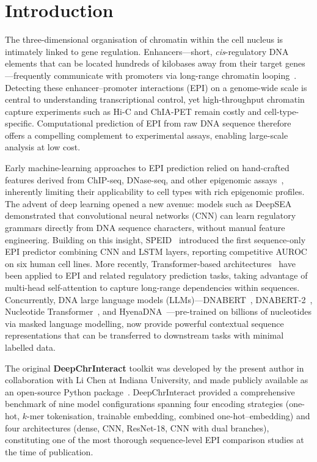\section{Introduction}
\label{sec:intro}

The three-dimensional organisation of chromatin within the cell nucleus is intimately
linked to gene regulation.
Enhancers---short, \emph{cis}-regulatory DNA elements that can be located hundreds of
kilobases away from their target genes---frequently communicate with promoters via
long-range chromatin looping~\cite{hic, ctcf}.
Detecting these enhancer--promoter interactions (EPI) on a genome-wide scale is
central to understanding transcriptional control, yet high-throughput chromatin capture
experiments such as Hi-C and ChIA-PET remain costly and cell-type-specific.
Computational prediction of EPI from raw DNA sequence therefore offers a compelling
complement to experimental assays, enabling large-scale analysis at low cost.

Early machine-learning approaches to EPI prediction relied on hand-crafted features
derived from ChIP-seq, DNase-seq, and other epigenomic assays~\cite{targetfinder},
inherently limiting their applicability to cell types with rich epigenomic profiles.
The advent of deep learning opened a new avenue: models such as DeepSEA~\cite{deepsea}
demonstrated that convolutional neural networks (CNN) can learn regulatory grammars
directly from DNA sequence characters, without manual feature engineering.
Building on this insight, SPEID~\cite{speid} introduced the first sequence-only EPI predictor
combining CNN and LSTM layers, reporting competitive AUROC on six human cell lines.
More recently, Transformer-based architectures~\cite{attention_all_you_need, epitrans}
have been applied to EPI and related regulatory prediction tasks, taking advantage of
multi-head self-attention to capture long-range dependencies within sequences.
Concurrently, DNA large language models (LLMs)---DNABERT~\cite{dnabert},
DNABERT-2~\cite{dnabert2}, Nucleotide Transformer~\cite{nucleotide_transformer},
and HyenaDNA~\cite{hyenadna}---pre-trained on billions of nucleotides via masked
language modelling, now provide powerful contextual sequence representations that
can be transferred to downstream tasks with minimal labelled data.

The original \textbf{DeepChrInteract} toolkit was developed by the present author in
collaboration with Li Chen at Indiana University, and made publicly available as an
open-source Python package~\cite{deepchrinteract_doc}.
DeepChrInteract provided a comprehensive benchmark of nine model configurations
spanning four encoding strategies (one-hot, $k$-mer tokenisation, trainable embedding,
combined one-hot--embedding) and four architectures (dense, CNN, ResNet-18, CNN
with dual branches), constituting one of the most thorough sequence-level EPI
comparison studies at the time of publication.

